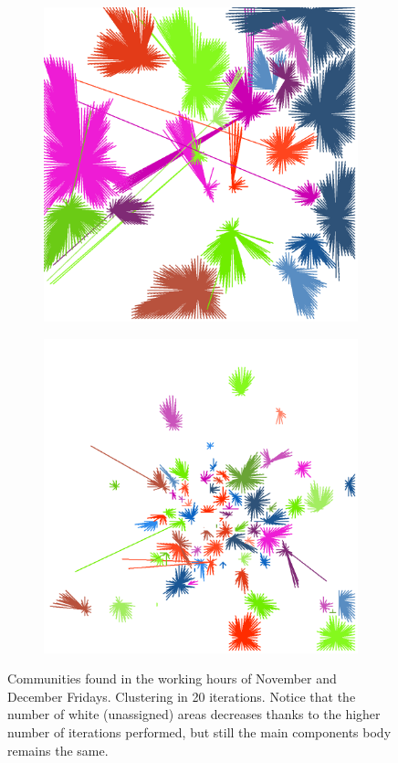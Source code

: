 \documentclass[12pt,a4paper]{article}
\begin{document}
\begin{figure}[H]
\begin{subfigure}[b]{0.3\textwidth}
\includegraphics[width=\textwidth]{weekDef/edges-5Fri-mid.png}
\end{subfigure}
\begin{subfigure}[b]{0.3\textwidth}
\includegraphics[width=\textwidth]{weekDef/edges-5Fri-small.png}
\end{subfigure}

\caption{Communities found in the working hours of November and December Fridays. Clustering in 20 iterations. Notice that the number of white (unassigned) areas decreases thanks to the higher number of iterations performed, but still the main components body remains the same.}
\label{fig:fridayworking}
\end{figure}
\end{document}
